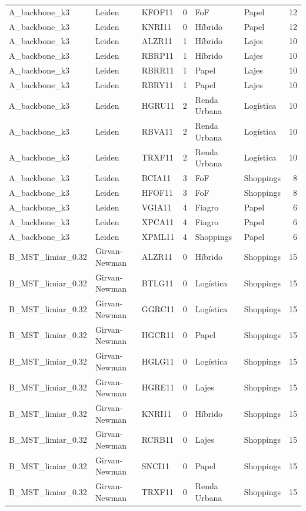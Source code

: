 \begin{tabular}{lllrllr}
A\_backbone\_k3 & Leiden & KFOF11 & 0 & FoF & Papel & 12 \\
A\_backbone\_k3 & Leiden & KNRI11 & 0 & Híbrido & Papel & 12 \\
A\_backbone\_k3 & Leiden & ALZR11 & 1 & Híbrido & Lajes & 10 \\
A\_backbone\_k3 & Leiden & RBRP11 & 1 & Híbrido & Lajes & 10 \\
A\_backbone\_k3 & Leiden & RBRR11 & 1 & Papel & Lajes & 10 \\
A\_backbone\_k3 & Leiden & RBRY11 & 1 & Papel & Lajes & 10 \\
A\_backbone\_k3 & Leiden & HGRU11 & 2 & Renda Urbana & Logística & 10 \\
A\_backbone\_k3 & Leiden & RBVA11 & 2 & Renda Urbana & Logística & 10 \\
A\_backbone\_k3 & Leiden & TRXF11 & 2 & Renda Urbana & Logística & 10 \\
A\_backbone\_k3 & Leiden & BCIA11 & 3 & FoF & Shoppings & 8 \\
A\_backbone\_k3 & Leiden & HFOF11 & 3 & FoF & Shoppings & 8 \\
A\_backbone\_k3 & Leiden & VGIA11 & 4 & Fiagro & Papel & 6 \\
A\_backbone\_k3 & Leiden & XPCA11 & 4 & Fiagro & Papel & 6 \\
A\_backbone\_k3 & Leiden & XPML11 & 4 & Shoppings & Papel & 6 \\
B\_MST\_limiar\_0.32 & Girvan-Newman & ALZR11 & 0 & Híbrido & Shoppings & 15 \\
B\_MST\_limiar\_0.32 & Girvan-Newman & BTLG11 & 0 & Logística & Shoppings & 15 \\
B\_MST\_limiar\_0.32 & Girvan-Newman & GGRC11 & 0 & Logística & Shoppings & 15 \\
B\_MST\_limiar\_0.32 & Girvan-Newman & HGCR11 & 0 & Papel & Shoppings & 15 \\
B\_MST\_limiar\_0.32 & Girvan-Newman & HGLG11 & 0 & Logística & Shoppings & 15 \\
B\_MST\_limiar\_0.32 & Girvan-Newman & HGRE11 & 0 & Lajes & Shoppings & 15 \\
B\_MST\_limiar\_0.32 & Girvan-Newman & KNRI11 & 0 & Híbrido & Shoppings & 15 \\
B\_MST\_limiar\_0.32 & Girvan-Newman & RCRB11 & 0 & Lajes & Shoppings & 15 \\
B\_MST\_limiar\_0.32 & Girvan-Newman & SNCI11 & 0 & Papel & Shoppings & 15 \\
B\_MST\_limiar\_0.32 & Girvan-Newman & TRXF11 & 0 & Renda Urbana & Shoppings & 15 \\

\end{tabular}
